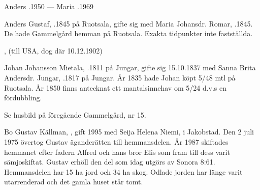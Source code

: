 Anders .1950  ---  Maria .1969


Anders Gustaf, .1845 på Ruotsala, gifte sig med Maria Johansdr. Romar, .1845. De hade Gammelgård hemman på Ruotsala. Exakta tidpunkter inte fastställda.
\begin{jhchildren}
  \item {}, (till USA, dog där 10.12.1902)
  \item {}
\end{jhchildren}


Johan Johansson Mietala, .1811 på Jungar, gifte sig 15.10.1837 med Sanna Brita Andersdr. Jungar, .1817 på Jungar. År 1835 hade Johan köpt 5/48 mtl på Ruotsala. År 1850 finns antecknat ett mantalsinnehav om 5/24 d.v.s en fördubbling.
\begin{jhchildren}
  \item {}
  \item {}
  \item {}
  \item {}
  \item {}
  \item {}
  \item {}
  \item {}
\end{jhchildren}




Se husbild på föregående Gammelgård, nr 15.

Bo Gustav Källman, , gift 1995 med Seija Helena Niemi,  i Jakobstad. Den 2 juli 1975 övertog Gustav äganderätten till hemmansdelen. År 1987 skiftades hemmanet efter fadern Alfred och hans bror Elis som fram till dess varit sämjoskiftat. Gustav erhöll den del som idag utgörs av Sonora 8:61. Hemmansdelen har 15 ha jord och 34 ha skog. Odlade jorden har länge varit utarrenderad och det gamla huset står tomt.

